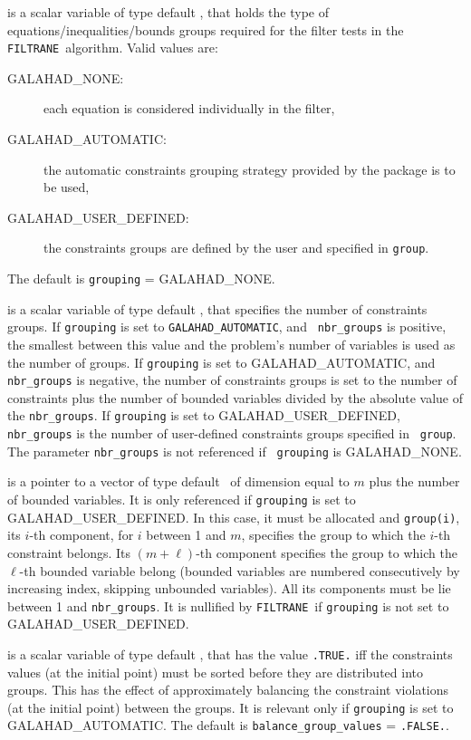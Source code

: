 \documentclass{galahad}
\newcommand{\packagename}{FILTRANE}
\newcommand{\sym}{\sf\small}
\newcommand{\filtrane}{{\tt \packagename}}
\begin{document}
\begin{description}
 is a scalar variable of type default \integer, that holds the
type of equations/inequalities/bounds groups required for the filter tests in
the \filtrane\ algorithm. Valid values are:
\begin{description}
\item[\sym GALAHAD\_NONE:] 
each equation is considered individually in the filter,
\item[\sym GALAHAD\_AUTOMATIC:] the automatic constraints grouping strategy 
provided by the package is to be used,
\item[\sym GALAHAD\_USER\_DEFINED:] the constraints groups are defined by 
the user and specified in {\tt group}.
\end{description}
The default is {\tt grouping} = {\sym GALAHAD\_NONE}.

 is a scalar variable of type default \integer, that
specifies the number of constraints groups. 
If {\tt grouping} is set to {\tt GALAHAD\_AUTOMATIC}, and {\tt
nbr\_groups} is positive, the smallest between this value and the
problem's number of variables is used as the number of groups.
If {\tt grouping} is set to {\sym GALAHAD\_AUTOMATIC}, and {\tt
nbr\_groups} is negative, the number of constraints groups is set to 
the number of constraints plus the number of bounded variables
divided by the absolute value of the {\tt nbr\_groups}.
If {\tt grouping} is set to {\sym GALAHAD\_USER\_DEFINED}, {\tt
nbr\_groups} is the number of user-defined constraints groups specified in {\tt
group}. The parameter {\tt nbr\_groups} is not referenced if {\tt
grouping} is {\sym GALAHAD\_NONE}.

 is a pointer to a vector of type default \integer\ of dimension
equal to $m$ plus the number of bounded variables. It is only referenced if
{\tt grouping} is set to {\sym GALAHAD\_USER\_DEFINED}. In this case,
it must be allocated and {\tt group(i)}, its $i$-th component, for $i$ between
1 and $m$, specifies the group to which the $i$-th constraint belongs. Its
$(m+\ell)$-th component specifies the group to which the $\ell$-th bounded
variable belong (bounded variables are numbered consecutively by increasing
index, skipping unbounded variables). All its components must be
lie between 1 and {\tt nbr\_groups}.  It is nullified by \filtrane\ if
{\tt grouping} is not set to {\sym GALAHAD\_USER\_DEFINED}.

 is a scalar variable of type default \logical, 
that has the value {\tt .TRUE.} iff the constraints values (at the initial
point) must be sorted before they are distributed into groups.
This has the effect of approximately balancing the 
constraint violations (at the initial point) between the groups. It is
relevant only if {\tt grouping} is set to {\sym GALAHAD\_AUTOMATIC}.
The default is {\tt balance\_group\_values} = {\tt .FALSE.}.


\end{description}
\end{document}
